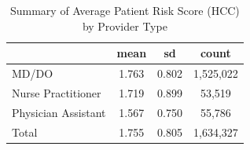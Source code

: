 \begin{table}[htbp]\centering
\def\sym#1{\ifmmode^{#1}\else\(^{#1}\)\fi}
\caption{Summary of Average Patient Risk Score (HCC) by Provider Type}
\begin{tabular}{l*{1}{ccc}}
\toprule
                    &        mean&          sd&       count\\
\midrule
MD/DO               &       1.763&       0.802&   1,525,022\\
Nurse Practitioner  &       1.719&       0.899&      53,519\\
Physician Assistant &       1.567&       0.750&      55,786\\
Total               &       1.755&       0.805&   1,634,327\\
\bottomrule
\end{tabular}
\end{table}
